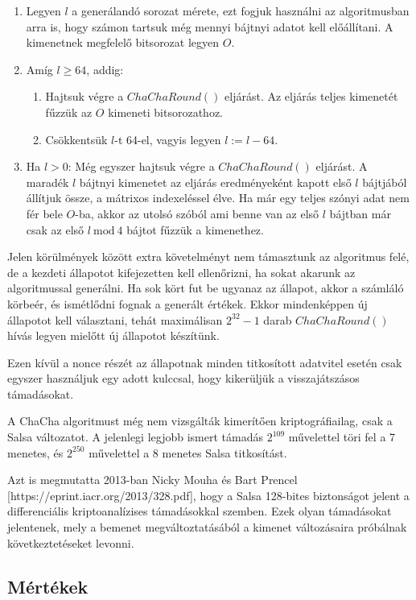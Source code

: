 \documentclass[12pt]{article}
\begin{document}
	\begin{enumerate}
		\item Legyen $l$ a generálandó sorozat mérete, ezt fogjuk használni az algoritmusban arra is, hogy számon tartsuk még mennyi bájtnyi adatot kell előállítani. A kimenetnek megfelelő bitsorozat legyen $O$.
		\item Amíg $l \geq 64$, addig:
		\begin{enumerate}
			\item Hajtsuk végre a $ChaChaRound()$ eljárást. Az eljárás teljes kimenetét fűzzük az $O$ kimeneti bitsorozathoz.
			\item Csökkentsük $l$-t 64-el, vagyis legyen $l := l - 64$.
		\end{enumerate}
		\item Ha $l > 0$: Még egyszer hajtsuk végre a $ChaChaRound()$ eljárást. A maradék $l$ bájtnyi kimenetet az eljárás eredményeként kapott első $l$ bájtjából állítjuk össze, a mátrixos indexeléssel élve. Ha már egy teljes szónyi adat nem fér bele $O$-ba, akkor az utolsó szóból ami benne van az első $l$ bájtban már csak az első $l \ \textrm{mod} \ 4$ bájtot fűzzük a kimenethez.
	\end{enumerate} 
	Jelen körülmények között extra követelményt nem támasztunk az algoritmus felé, de a kezdeti állapotot kifejezetten kell ellenőrizni, ha sokat akarunk az algoritmussal generálni. Ha sok kört fut be ugyanaz az állapot, akkor a számláló körbeér, és ismétlődni fognak a generált értékek. Ekkor mindenképpen új állapotot kell választani, tehát maximálisan $2^{32}-1$ darab $ChaChaRound()$ hívás legyen mielőtt új állapotot készítünk.
	
	Ezen kívül a nonce részét az állapotnak minden titkosított adatvitel esetén csak egyszer használjuk egy adott kulccsal, hogy kikerüljük a visszajátszásos támadásokat.
	
	A ChaCha algoritmust még nem vizsgálták kimerítően kriptográfiailag, csak a Salsa változatot. A jelenlegi legjobb ismert támadás $2^{109}$ művelettel töri fel a 7 menetes, és $2^{250}$ művelettel a 8 menetes Salsa titkosítást.
	
	Azt is megmutatta 2013-ban Nicky Mouha és Bart Prencel [https://eprint.iacr.org/2013/328.pdf], hogy a Salsa 128-bites biztonságot jelent a differenciális kriptoanalízises támadásokkal szemben. Ezek olyan támadásokat jelentenek, mely a bemenet megváltoztatásából a kimenet változásaira próbálnak következtetéseket levonni.
	\subsection{Mértékek}
\end{document}
